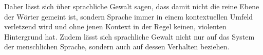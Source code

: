 Daher lässt sich über sprachliche Gewalt sagen, dass damit nicht die reine Ebene der Wörter gemeint ist, sondern Sprache immer in einem kontextuellen Umfeld verletzend wird und ohne jenen Kontext in der Regel keinen, violenten Hintergrund hat.
Zudem lässt sich sprachliche Gewalt nicht nur auf das System der menschlichen Sprache, sondern auch auf dessen Verhalten beziehen.
